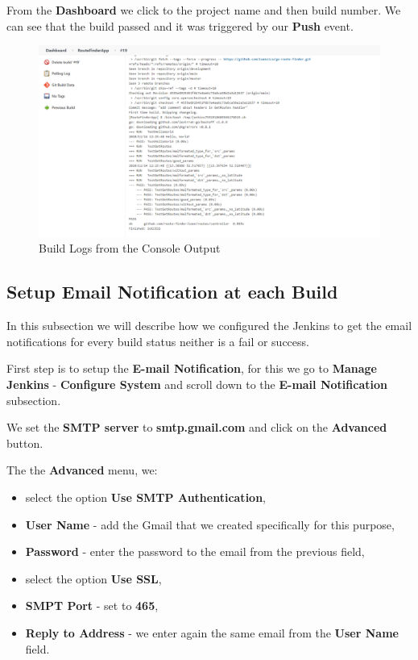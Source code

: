 \documentclass[12pt,a4paper,twoside]{article}
\begin{document}
From the \textbf{Dashboard} we click to the project name and then build number. We can see that the build passed and it was triggered by our \textbf{Push} event.

\begin{figure}[H]
    \centering
        \includegraphics[width=15cm]{images-aws/50-triggered-push-logs.png}
        \caption{Build Logs from the Console Output}
\end{figure}





\subsection{Setup Email Notification at each Build}


In this subsection we will describe how we configured the Jenkins to get the email notifications for every build status neither is a fail or success.


First step is to setup the \textbf{E-mail Notification}, for this we go to \textbf{Manage Jenkins} - \textbf{Configure System} and scroll down to the \textbf{E-mail Notification} subsection.


We set the \textbf{SMTP server} to \textbf{smtp.gmail.com} and click on the \textbf{Advanced} button.


The the \textbf{Advanced} menu, we:


\begin{itemize}
	\item  select the option \textbf{Use SMTP Authentication},
	\item \textbf{User Name} - add the Gmail that we created specifically for this purpose,
	\item \textbf{Password} - enter the password to the email from the previous field,
	\item  select the option \textbf{Use SSL},
	\item \textbf{SMPT Port} - set to \textbf{465},
	\item \textbf{Reply to Address} - we enter again the same email from the \textbf{User Name} field.
\end{itemize}
\end{document}
